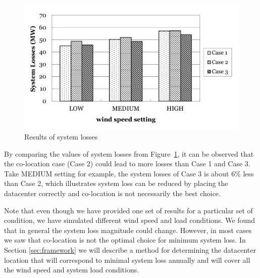 \begin{figure}[ht]
\centering
\includegraphics[width=1\columnwidth]{img/loss3cases.pdf}
\caption{Results of system losses}
\label{fig:loss-cases}
\end{figure}

By comparing the values of system losses from Figure~\ref{fig:loss-cases}, it can be observed that the co-location case (Case 2) could lead to more losses than Case 1 and Case 3. Take MEDIUM setting for example, the system losses of Case 3 is about 6\% less than Case 2, which illustrates system loss can be reduced by placing the datacenter correctly and co-location is not necessarily the best choice.


Note that even though we have provided one set of results for a particular set of condition, we have simulated different wind speed and load conditions. We found that in general the system loss magnitude could change. However, in most cases we saw that co-location is not the optimal choice for minimum system loss. In Section \ref{sec:framework} we will describe a method for determining the datacenter location that will correspond to minimal system loss annually and will cover all the wind speed and system load conditions.

